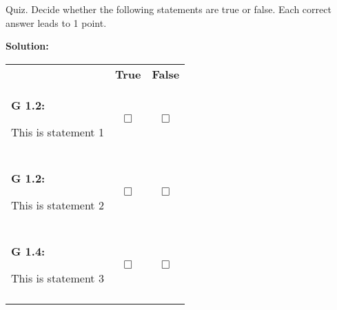 \newpage
\begin{question}{46}
	\vspace{0.2cm}

	 Quiz. Decide whether the following statements are true or false. Each correct answer leads to 1 point. \\
	\begin{solution}
		\textbf{Solution:}
	\end{solution}

	 \begin{tabular}{p{30em} c c} 
  
		& \textbf{True} & \textbf{False} \\ 
                        
		\begin{learningGoal}\textbf{G 1.2:}\end{learningGoal}
		This is statement 1  & 
		 \begin{solution}\rlap{\xmark}\end{solution}$\Box$    &$\Box$    \\                                                                                                               
		& & \\

		\begin{learningGoal}\textbf{G 1.2:}\end{learningGoal}
		This is statement 2 & 
		$\Box$    & \begin{solution}\rlap{\xmark}\end{solution}$\Box$    \\                                                                                                               
		& & \\

		\begin{learningGoal}\textbf{G 1.4:}\end{learningGoal}
		This is statement 3  & 
		\begin{solution}\rlap{\xmark}\end{solution}$\Box$    &$\Box$    \\                                                                                                               
		& & \\
                    
	\end{tabular}
\end{question}




